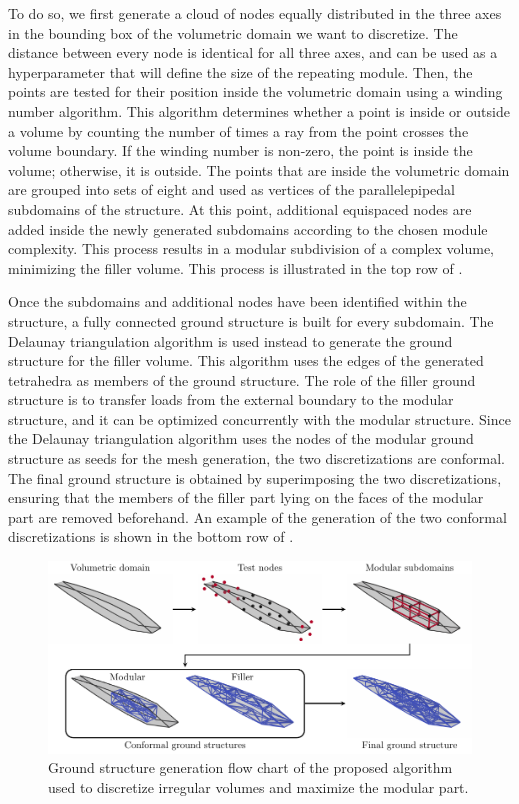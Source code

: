 To do so, we first generate a cloud of nodes equally distributed in the three axes in the bounding box of the volumetric domain we want to discretize. The distance between every node is identical for all three axes, and can be used as a hyperparameter that will define the size of the repeating module. Then, the points are tested for their position inside the volumetric domain using a winding number algorithm. This algorithm determines whether a point is inside or outside a volume by counting the number of times a ray from the point crosses the volume boundary. If the winding number is non-zero, the point is inside the volume; otherwise, it is outside. The points that are inside the volumetric domain are grouped into sets of eight and used as vertices of the parallelepipedal subdomains of the structure. At this point, additional equispaced nodes are added inside the newly generated subdomains according to the chosen module complexity. This process results in a modular subdivision of a complex volume, minimizing the filler volume. This process is illustrated in the top row of .

Once the subdomains and additional nodes have been identified within the structure, a fully connected ground structure is built for every subdomain. The Delaunay triangulation algorithm is used instead to generate the ground structure for the filler volume. This algorithm uses the edges of the generated tetrahedra as members of the ground structure. The role of the filler ground structure is to transfer loads from the external boundary to the modular structure, and it can be optimized concurrently with the modular structure. Since the Delaunay triangulation algorithm uses the nodes of the modular ground structure as seeds for the mesh generation, the two discretizations are conformal. The final ground structure is obtained by superimposing the two discretizations, ensuring that the members of the filler part lying on the faces of the modular part are removed beforehand. An example of the generation of the two conformal discretizations is shown in the bottom row of .

\begin{figure}
    \centering
    \includegraphics[width=\linewidth]{figures/07_aeronautic/00_naca_howtomesh/MESH.pdf}
     \caption{Ground structure generation flow chart of the proposed algorithm used to discretize irregular volumes and maximize the modular part.}
    \label{fig:07_howto}
\end{figure}

